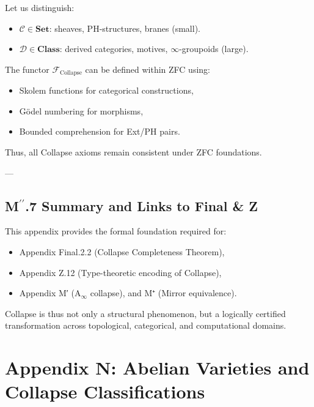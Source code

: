 \documentclass[11pt]{article}
\begin{document}
\begin{axiom}
\begin{axiom}
{{Let us distinguish:
\begin{itemize}
  \item $\mathcal{C} \in \mathbf{Set}$: sheaves, PH-structures, branes (small).
  \item $\mathcal{D} \in \mathbf{Class}$: derived categories, motives, $\infty$-groupoids (large).
\end{itemize}

\begin{proposition}
The functor $\mathcal{F}_{\text{Collapse}}$ can be defined within ZFC using:
\begin{itemize}
  \item Skolem functions for categorical constructions,
  \item Gödel numbering for morphisms,
  \item Bounded comprehension for Ext/PH pairs.
\end{itemize}
Thus, all Collapse axioms remain consistent under ZFC foundations.
\end{proposition}

---

\subsection*{M$^{\prime\prime}$.7 Summary and Links to Final \& Z}

This appendix provides the formal foundation required for:

\begin{itemize}
  \item Appendix Final.2.2 (Collapse Completeness Theorem),
  \item Appendix Z.12 (Type-theoretic encoding of Collapse),
  \item Appendix M′ (A$_\infty$ collapse), and M⁺ (Mirror equivalence).
\end{itemize}

Collapse is thus not only a structural phenomenon,  
but a logically certified transformation across topological, categorical, and computational domains.




\section*{Appendix N: Abelian Varieties and Collapse Classifications}

}}
\end{axiom}
\end{axiom}
\end{document}
